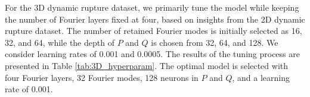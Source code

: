 \documentclass[draft]{agujournal2019}
\begin{document}



For the 3D dynamic rupture dataset, we primarily tune the model while keeping the number of Fourier layers fixed at four, based on insights from the 2D dynamic rupture dataset. The number of retained Fourier modes is initially selected as 16, 32, and 64, while the depth of \(P\) and \(Q\) is chosen from 32, 64, and 128. We consider learning rates of 0.001 and 0.0005. The results of the tuning process are presented in Table \ref{tab:3D_hyperparam}. The optimal model is selected with four Fourier layers, 32 Fourier modes, 128 neurons in \(P\) and \(Q\), and a learning rate of 0.001.
\end{document}
